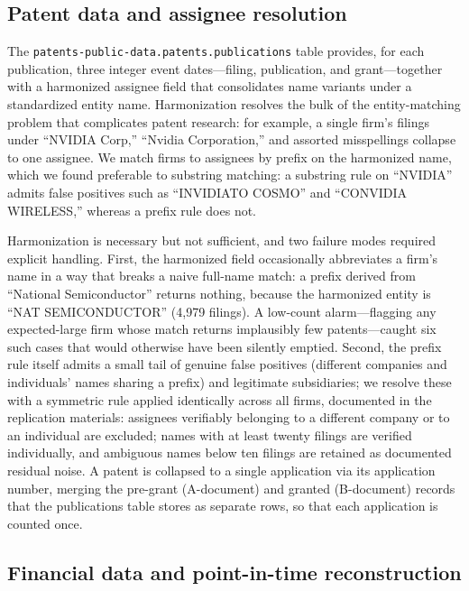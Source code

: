 \documentclass[11pt]{article}
\begin{document}
\subsection{Patent data and assignee resolution}

The \texttt{patents-public-data.patents.publications} table provides, for each publication, three integer event dates---filing, publication, and grant---together with a harmonized assignee field that consolidates name variants under a standardized entity name. Harmonization resolves the bulk of the entity-matching problem that complicates patent research: for example, a single firm's filings under ``NVIDIA Corp,'' ``Nvidia Corporation,'' and assorted misspellings collapse to one assignee. We match firms to assignees by prefix on the harmonized name, which we found preferable to substring matching: a substring rule on ``NVIDIA'' admits false positives such as ``INVIDIATO COSMO'' and ``CONVIDIA WIRELESS,'' whereas a prefix rule does not.

Harmonization is necessary but not sufficient, and two failure modes required explicit handling. First, the harmonized field occasionally abbreviates a firm's name in a way that breaks a naive full-name match: a prefix derived from ``National Semiconductor'' returns nothing, because the harmonized entity is ``NAT SEMICONDUCTOR'' (4,979 filings). A low-count alarm---flagging any expected-large firm whose match returns implausibly few patents---caught six such cases that would otherwise have been silently emptied. Second, the prefix rule itself admits a small tail of genuine false positives (different companies and individuals' names sharing a prefix) and legitimate subsidiaries; we resolve these with a symmetric rule applied identically across all firms, documented in the replication materials: assignees verifiably belonging to a different company or to an individual are excluded; names with at least twenty filings are verified individually, and ambiguous names below ten filings are retained as documented residual noise. A patent is collapsed to a single application via its application number, merging the pre-grant (A-document) and granted (B-document) records that the publications table stores as separate rows, so that each application is counted once.

\subsection{Financial data and point-in-time reconstruction}
\end{document}
